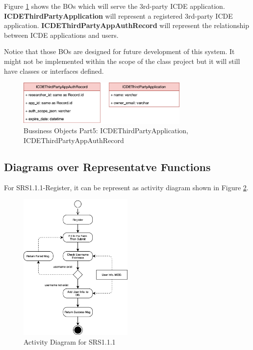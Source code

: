 Figure \ref{fig:bo_classes_6} shows the BOs which will serve the 3rd-party ICDE application. 
\textbf{ICDEThirdPartyApplication} will represent a registered 3rd-party ICDE application.
\textbf{ICDEThirdPartyAppAuthRecord} will represent the relationship between ICDE applications and users.

Notice that those BOs are designed for future development of this system. It might not be implemented within the scope of the class project but it will still have classes or interfaces defined.

\begin{figure}[t]
	\centering
	\includegraphics[width=0.75\textwidth]{./img/bo_classes_6.png}
	\caption{Bussiness Objects Part5: ICDEThirdPartyApplication, ICDEThirdPartyAppAuthRecord}
	
	\label{fig:bo_classes_6}
\end{figure}

\subsection{Diagrams over Representatve Functions}

For SRS1.1.1-Register, it can be represent as activity diagram shown in Figure \ref{fig:srs_diagram_1}.

\begin{figure}[t]
	\centering
	\includegraphics[width=0.5\textwidth]{./img/srs_diagram_1.png}
	\caption{Activity Diagram for SRS1.1.1}
	
	\label{fig:srs_diagram_1}
\end{figure}


